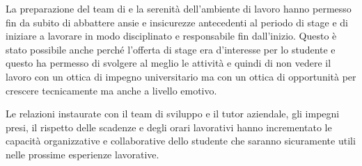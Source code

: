 La preparazione del team di \visione{} e la serenità dell'ambiente di lavoro hanno permesso fin da subito di abbattere ansie e insicurezze antecedenti al periodo di stage e di iniziare a lavorare in modo disciplinato e responsabile fin dall'inizio. Questo è stato possibile anche perché l'offerta di stage era d'interesse per lo studente e questo ha permesso di svolgere al meglio le attività e quindi di non vedere il lavoro con un ottica di impegno universitario ma con un ottica di opportunità per crescere tecnicamente ma anche a livello emotivo.

Le relazioni instaurate con il team di sviluppo e il tutor aziendale, gli impegni presi, il rispetto delle scadenze e degli orari lavorativi hanno incrementato le capacità organizzative e collaborative dello studente che saranno sicuramente utili nelle prossime esperienze lavorative.